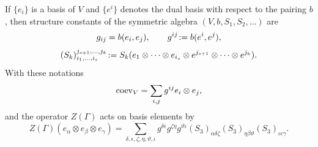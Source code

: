 If $\{e_i\}$ is a basis of $V$ and $\{e^i\}$ denotes the dual
basis with respect to the pairing $b$, then structure constants of
the symmetric algebra $(V,b,S_1,S_2,\dots)$ are
\begin{equation*}
  g_{ij}=b(e_i,e_j),\qquad g^{ij}\joinrel:=b(e^i,e^j),
\end{equation*}
\begin{equation*}
  (S_k)_{i_1,\dots,i_s}^{j_{s+1},\dots,j_k}\joinrel:=S_k(e_1\otimes\cdots\otimes
  e_{i_s}\otimes e^{j_{s+1}}\otimes\cdots\otimes e^{j_k}).
\end{equation*}
With these notations
\begin{equation*}
  \operatorname{coev}_V=\sum_{i,j}g^{ij}e_i\otimes e_j,
\end{equation*}
and the operator $Z(\Gamma)$ acts on basis elements by
\begin{equation*}
  Z(\Gamma)(e_\alpha\otimes e_\beta\otimes
  e_\gamma)=\sum_{\delta,\epsilon,\zeta,\eta,\vartheta,\iota}g^{\delta\epsilon}
  g^{\zeta\eta}g^{\vartheta\iota} (S_3)_{\alpha\delta\zeta}
  (S_3)_{\eta\beta\vartheta} (S_3)_{\iota\epsilon\gamma}.
\end{equation*}



